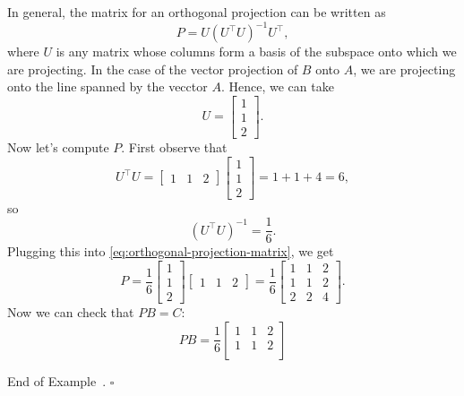 \documentclass[10pt]{article}
\theoremstyle{definition}
\newtheorem{example}[theorem]{Example}
\renewenvironment{example}
{\begin{oldexample}}
  {\par\smallskip\hfill   End of Example~\theexample. $\square$    \par\end{oldexample}}
\begin{document}
\begin{example}[Projections]
  In general, the matrix for an orthogonal projection can be written as
  \begin{equation}\label{eq:orthogonal-projection-matrix}
    P = U(U^{\top}U)^{-1}U^{\top},
  \end{equation}
  where $U$ is any matrix whose columns form a basis of the subspace onto
  which we are projecting. In the case of the vector projection of $B$ onto
  $A$, we are projecting onto the line spanned by the vecctor $A$. Hence, we
  can take
  \begin{equation*}
    U =
    \begin{bmatrix}
      1\\1\\2
    \end{bmatrix}.
  \end{equation*}
  Now let's compute $P$. First observe that
  \begin{equation*}
    U^{\top}U =
    \begin{bmatrix}
      1&1&2
    \end{bmatrix}
    \begin{bmatrix}
      1\\1\\2
    \end{bmatrix}
    =
    1+1+4=6,
  \end{equation*}
  so
  \begin{equation*}
    (U^{\top}U)^{-1} = \frac{1}{6}.
  \end{equation*}
  Plugging this into \cref{eq:orthogonal-projection-matrix}, we get
  \begin{equation*}
    P =
    \frac{1}{6}
    \begin{bmatrix}
      1\\1\\2
    \end{bmatrix}
    \begin{bmatrix}
      1&1&2
    \end{bmatrix}
    =
    \frac{1}{6}
    \begin{bmatrix}
      1&1&2\\
      1&1&2\\
      2&2&4
    \end{bmatrix}.
  \end{equation*}
  Now we can check that $PB=C$:
  \begin{equation*}
    PB = \frac{1}{6}
    \begin{bmatrix}
      1&1&2\\
      1&1&2\\

\end{bmatrix}
\end{equation*}
\end{example}
\end{document}
